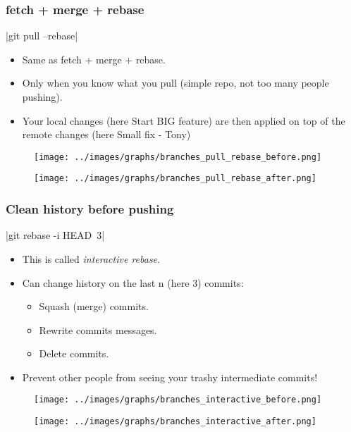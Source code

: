 \begin{frame}
\frametitle{fetch + merge + rebase}
   |git pull --rebase|
   \begin{itemize}
      \item Same as fetch + merge + rebase.
      \item \alert{Only when you know what you pull} (simple repo, not too many people pushing).
      \item Your local changes (here Start BIG feature) are then applied on top of the remote changes (here Small fix - Tony)
   \end{itemize}
   \begin{minipage}{0.48\linewidth}
      \begin{figure}
         \centering
         \texttt{[image: ../images/graphs/branches\_pull\_rebase\_before.png]}
      \end{figure}
   \end{minipage}
   \begin{minipage}{0.48\linewidth}
      \begin{figure}
         \centering
         \texttt{[image: ../images/graphs/branches\_pull\_rebase\_after.png]}
      \end{figure}
   \end{minipage}
\end{frame}

\begin{frame}
\frametitle{Clean history before pushing}
   |git rebase -i HEAD~3|
   \begin{itemize}
      \item This is called {\it interactive rebase}.
      \item Can change history on the last n (here 3) commits:
         \begin{itemize}
            \item Squash (merge) commits.
            \item Rewrite commits messages.
            \item Delete commits.
         \end{itemize}
      \item \alert{Prevent other people from seeing your trashy intermediate commits!}
   \end{itemize}
   \begin{minipage}{0.48\linewidth}
      \begin{figure}
         \centering
         \texttt{[image: ../images/graphs/branches\_interactive\_before.png]}
      \end{figure}
   \end{minipage}
   \begin{minipage}{0.48\linewidth}
      \begin{figure}
         \centering
         \texttt{[image: ../images/graphs/branches\_interactive\_after.png]}
      \end{figure}
   \end{minipage}
\end{frame}

